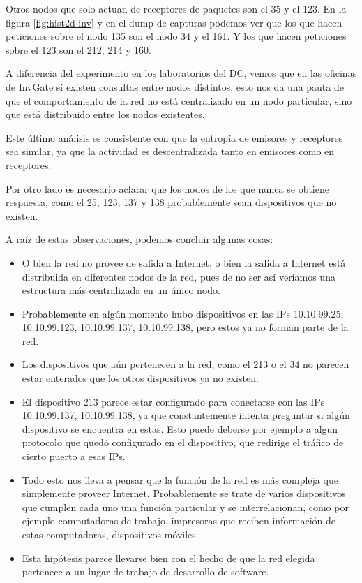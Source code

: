 Otros nodos que solo actuan de receptores de paquetes son el 35 y el 123. En la figura \ref{fig:hist2d-inv} y en el dump de capturas podemos ver que los que hacen peticiones sobre el nodo 135 son el nodo 34 y el 161. Y los que hacen peticiones sobre el 123 son el 212, 214 y 160.

A diferencia del experimento en los laboratorios del DC, vemos que en las oficinas de InvGate sí existen consultas entre nodos distintos, esto nos da una pauta de que el comportamiento de la red no está centralizado en un nodo particular, sino que está distribuido entre los nodos existentes. 

Este último análisis es consistente con que la entropía de emisores y receptores sea similar, ya que la actividad es descentralizada tanto en emisores como en receptores.

Por otro lado es necesario aclarar que los nodos de los que nunca se obtiene respuesta, como el 25, 123, 137 y 138 probablemente sean dispositivos que no existen.

A raíz de estas observaciones, podemos concluir algunas cosas:
\begin{itemize}
  \item O bien la red no provee de salida a Internet, o bien la salida a Internet está distribuida en diferentes nodos de la red, pues de no ser así veríamos una estructura más centralizada en un único nodo.
  \item Probablemente en algún momento hubo dispositivos en las IPs 10.10.99.25, 10.10.99.123, 10.10.99.137, 10.10.99.138, pero estos ya no forman parte de la red.
  \item Los dispositivos que aún pertenecen a la red, como el 213 o el 34 no parecen estar enterados que los otros dispositivos ya no existen.
  \item El dispositivo 213 parece estar configurado para conectarse con las IPs 10.10.99.137, 10.10.99.138, ya que constantemente intenta preguntar si algún dispositivo se encuentra en estas. Esto puede deberse por ejemplo a algun protocolo que quedó configurado en el dispositivo, que redirige el tráfico de cierto puerto a esas IPs.
  \item Todo esto nos lleva a pensar que la función de la red es más compleja que simplemente proveer Internet. Probablemente se trate de varios dispositivos que cumplen cada uno una función particular y se interrelacionan, como por ejemplo computadoras de trabajo, impresoras que reciben información de estas computadoras, dispositivos móviles.
  \item Esta hipótesis parece llevarse bien con el hecho de que la red elegida pertenece a un lugar de trabajo de desarrollo de software.
\end{itemize}

